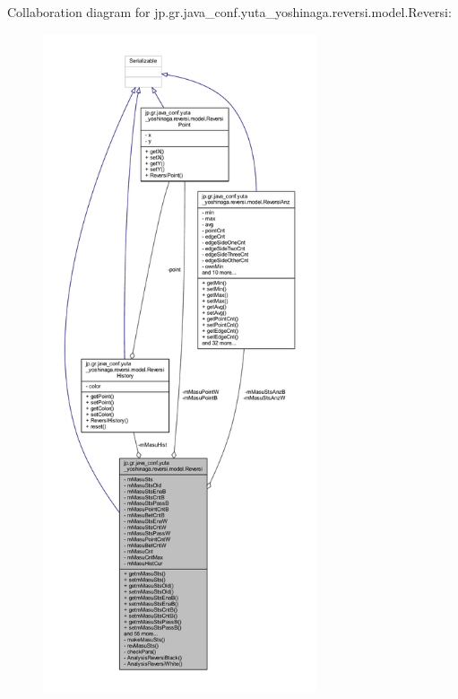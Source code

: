 Collaboration diagram for jp.\+gr.\+java\+\_\+conf.\+yuta\+\_\+yoshinaga.\+reversi.\+model.\+Reversi\+:
\nopagebreak
\begin{figure}[H]
\begin{center}
\leavevmode
\includegraphics[height=550pt]{classjp_1_1gr_1_1java__conf_1_1yuta__yoshinaga_1_1reversi_1_1model_1_1_reversi__coll__graph}
\end{center}
\end{figure}
